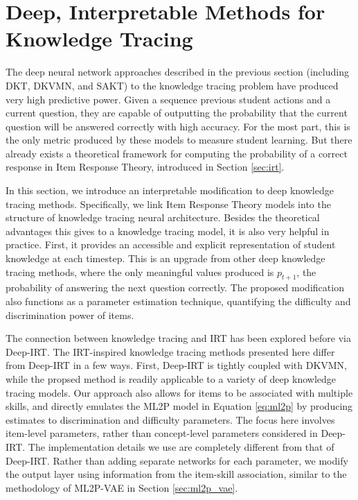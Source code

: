 \chapter{Deep, Interpretable Methods for Knowledge Tracing} \label{ch:kt_methods}

The deep neural network approaches described in the previous section (including DKT, DKVMN, and SAKT) to the knowledge tracing problem have produced very high predictive power. Given a sequence previous student actions and a current question, they are capable of outputting the probability that the current question will be answered correctly with high accuracy. For the most part, this is the only metric produced by these models to measure student learning. But there already exists a theoretical framework for computing the probability of a correct response in Item Response Theory, introduced in Section \ref{sec:irt}.

In this section, we introduce an interpretable modification to deep knowledge tracing methods. Specifically, we link Item Response Theory models into the structure of knowledge tracing neural architecture. Besides the theoretical advantages this gives to a knowledge tracing model, it is also very helpful in practice. First, it provides an accessible and explicit representation of student knowledge at each timestep. This is an upgrade from other deep knowledge tracing methods, where the only meaningful values produced is $p_{t+1}$, the probability of answering the next question correctly. The proposed modification also functions as a parameter estimation technique, quantifying the difficulty and discrimination power of items.

The connection between knowledge tracing and IRT has been explored before via Deep-IRT. The IRT-inspired knowledge tracing methods presented here differ from Deep-IRT in a few ways. First, Deep-IRT is tightly coupled with DKVMN, while the propsed method is readily applicable to a variety of deep knowledge tracing models. Our approach also allows for items to be associated with multiple skills, and directly emulates the ML2P model in Equation \ref{eq:ml2p} by producing estimates to discrimination and difficulty parameters. The focus here involves item-level parameters, rather than concept-level parameters considered in Deep-IRT. The implementation details we use are completely different from that of Deep-IRT. Rather than adding separate networks for each parameter, we modify the output layer using information from the item-skill association, similar to the methodology of ML2P-VAE in Section \ref{sec:ml2p_vae}.

